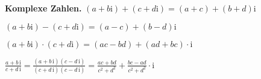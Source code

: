 \textbf{Komplexe Zahlen.} $(a+b\mathrm i)+(c+d\mathrm i)=(a+c)+(b+d)\mathrm i$

$(a + b \mathrm i) - (c + d \mathrm i) = (a - c) + (b - d) \mathrm i$

$(a+b\mathrm{i})\cdot(c+d\mathrm{i})=(ac-bd) + (ad+bc)\cdot\mathrm i$

$\frac{a+b\,\mathrm i}{c+d\,\mathrm i} = \frac{(a+b\,\mathrm i)(c-d\,\mathrm i)}{(c+d\,\mathrm i)(c-d\,\mathrm i)} = \frac{ac+bd}{c^2+d^2}+\frac{bc-ad}{c^2+d^2}\cdot\mathrm i$